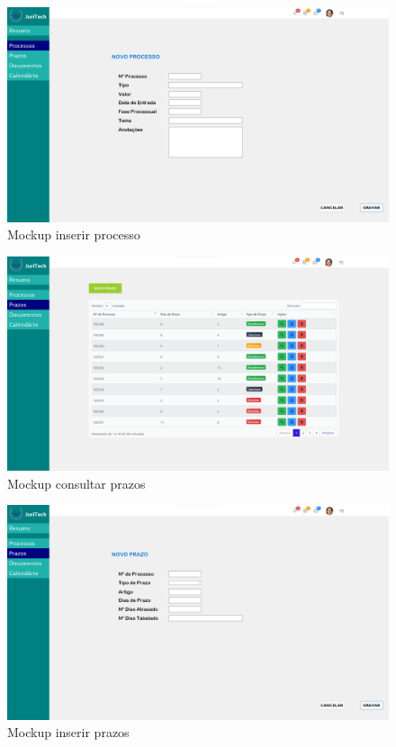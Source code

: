 \begin{figure}[!h]
\centering
\includegraphics[width=1\textwidth]{Figuras/inserir_processo.png}
\caption{Mockup inserir processo}
\label{d.componentes}
\end{figure}

\begin{figure}[!h]
\centering
\includegraphics[width=1\textwidth]{Figuras/consultar_prazos.png}
\caption{Mockup consultar prazos}
\label{d.componentes}
\end{figure}

\begin{figure}[!h]
\centering
\includegraphics[width=1\textwidth]{Figuras/inserir_prazos.png}
\caption{Mockup inserir prazos}
\label{d.componentes}
\end{figure}
